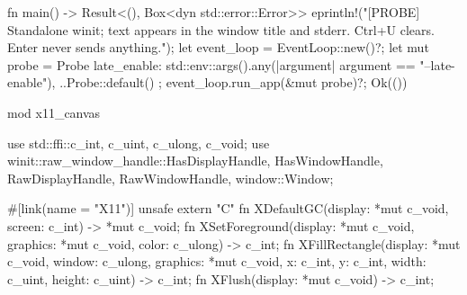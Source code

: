fn main() -> Result<(), Box<dyn std::error::Error>> {
    eprintln!("[PROBE] Standalone winit; text appears in the window title and stderr. Ctrl+U clears. Enter never sends anything.");
    let event_loop = EventLoop::new()?;
    let mut probe = Probe {
        late_enable: std::env::args().any(|argument| argument == "--late-enable"),
        ..Probe::default()
    };
    event_loop.run_app(&mut probe)?;
    Ok(())
}

mod x11_canvas {
    use std::ffi::{c_int, c_uint, c_ulong, c_void};
    use winit::{raw_window_handle::{HasDisplayHandle, HasWindowHandle, RawDisplayHandle, RawWindowHandle}, window::Window};

    #[link(name = "X11")]
    unsafe extern "C" {
        fn XDefaultGC(display: *mut c_void, screen: c_int) -> *mut c_void;
        fn XSetForeground(display: *mut c_void, graphics: *mut c_void, color: c_ulong) -> c_int;
        fn XFillRectangle(display: *mut c_void, window: c_ulong, graphics: *mut c_void,
                          x: c_int, y: c_int, width: c_uint, height: c_uint) -> c_int;
        fn XFlush(display: *mut c_void) -> c_int;
    }

}
